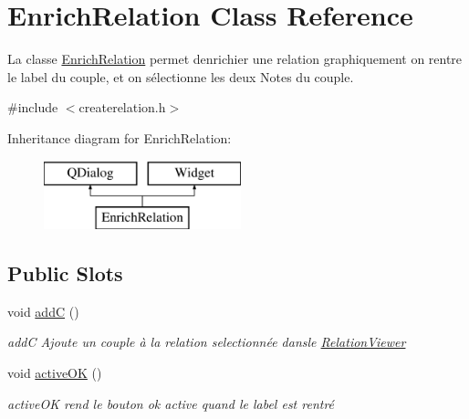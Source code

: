\hypertarget{classEnrichRelation}{}\section{Enrich\+Relation Class Reference}
\label{classEnrichRelation}


La classe \hyperlink{classEnrichRelation}{Enrich\+Relation} permet d\textquotesingle{}enrichier une relation graphiquement on rentre le label du couple, et on sélectionne les deux Notes du couple.  




{\ttfamily \#include $<$createrelation.\+h$>$}

Inheritance diagram for Enrich\+Relation\+:\begin{figure}[H]
\begin{center}
\leavevmode
\includegraphics[height=2.000000cm]{classEnrichRelation}
\end{center}
\end{figure}
\subsection*{Public Slots}
\begin{DoxyCompactItemize}
\item 
\mbox{\label{classEnrichRelation_a0221c1ad2c4e935a75e9dcd152560870}} 
void \hyperlink{classEnrichRelation_a0221c1ad2c4e935a75e9dcd152560870}{addC} ()
\begin{DoxyCompactList}\small\item\em addC Ajoute un couple à la relation selectionnée dansle \hyperlink{classRelationViewer}{Relation\+Viewer} \end{DoxyCompactList}\item 
\mbox{\label{classEnrichRelation_aae575f750894bb183f14bfa00a1e3923}} 
void \hyperlink{classEnrichRelation_aae575f750894bb183f14bfa00a1e3923}{active\+OK} ()
\begin{DoxyCompactList}\small\item\em active\+OK rend le bouton ok active quand le label est rentré \end{DoxyCompactList}\end{DoxyCompactItemize}
